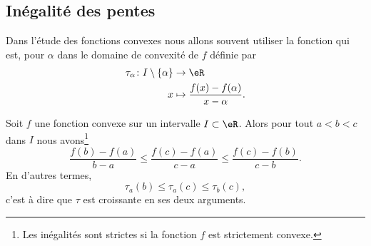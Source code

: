 \subsection{Inégalité des pentes}

Dans l'étude des fonctions convexes nous allons souvent utiliser la fonction  qui est, pour \( \alpha\) dans le domaine de convexité de \( f\) définie par
\begin{equation}    \label{EqRYBazWd}
    \begin{aligned}
        \tau_{\alpha}\colon I\setminus\{ \alpha \}&\to \eR \\
        x&\mapsto \frac{ f(x)-f(\alpha) }{ x-\alpha }. 
    \end{aligned}
\end{equation}

\begin{proposition} \label{PropMDMGjGO}
    Soit \( f\) une fonction convexe sur un intervalle \( I\subset \eR\). Alors pour tout \( a<b<c\) dans \( I\) nous avons\footnote{Les inégalités sont strictes si la fonction \( f\) est strictement convexe.}
    \begin{equation}
        \frac{ f(b)-f(a)  }{ b-a }\leq\frac{ f(c)-f(a) }{ c-a }\leq \frac{ f(c)-f(b) }{ c-b }.
    \end{equation}
    En d'autres termes,
    \begin{equation}
        \tau_a(b)\leq\tau_a(c)\leq \tau_b(c),
    \end{equation}
    c'est à dire que \( \tau\) est croissante en ses deux arguments.
\end{proposition}

